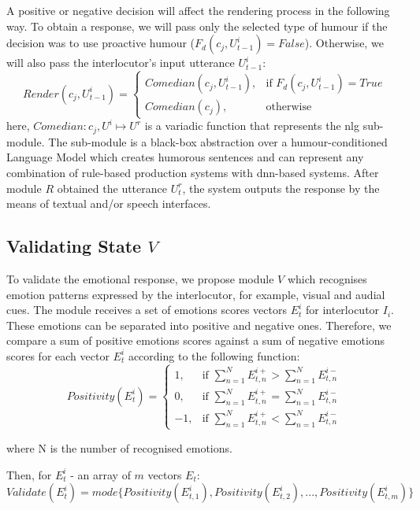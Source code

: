A positive or negative decision will affect the rendering process in the following way. To obtain a response, we will pass only the selected type of humour if the decision was to use proactive humour (\( F_d(c_j, U_{t-1}^i) = False\)). Otherwise, we will also pass the interlocutor's input utterance \( U_{t-1}^i\):
$$
Render(c_j, U_{t-1}^i)=
    \begin{cases}
        Comedian(c_j, U_{t-1}^i), & \text{if $F_d(c_j, U_{t-1}^i) = True$}\\
        Comedian(c_j), & \text{otherwise}
    \end{cases}
$$
here, \( Comedian: {c_j, U^i} \mapsto U^r\) is a variadic function that represents the \acrshort{nlg} sub-module. The sub-module is a black-box abstraction over a humour-conditioned Language Model which creates humorous sentences and can represent any combination of rule-based production systems with \acrshort{dnn}-based systems. After module \( R\) obtained the utterance \( U_t^r\), the system outputs the response by the means of textual and/or speech interfaces. \par

\subsection{Validating State \texorpdfstring{\( V\)}{V}}\label{subs:V}

To validate the emotional response, we propose module \( V\) which recognises emotion patterns expressed by the interlocutor, for example, visual and audial cues. The module receives a set of emotions scores vectors \( E_t^i\) for interlocutor \( I_i\). These emotions can be separated into positive and negative ones. Therefore, we compare a sum of positive emotions scores against a sum of negative emotions scores for each vector \( E_t^i\) according to the following function:
$$
Positivity(E_t^i)=
    \begin{cases}
        1, & \text{if $\sum_{n=1}^{N} E_{t,n}^{i+} > \sum_{n=1}^{N} E_{t,n}^{i-}$} \\
        0, & \text{if $\sum_{n=1}^{N} E_{t,n}^{i+} = \sum_{n=1}^{N} E_{t,n}^{i-}$} \\
        -1, & \text{if $\sum_{n=1}^{N} E_{t,n}^{i+} < \sum_{n=1}^{N} E_{t,n}^{i-}$}
    \end{cases}
$$ \par
where N is the number of recognised emotions. \par

Then, for \( E_t^{i}\) - an array of \( m\) vectors \( E_t\):
\[ Validate(E_t^{i})=mode\{Positivity(E_{t,1}^{i}), Positivity(E_{t,2}^{i}),..., Positivity(E_{t,m}^{i})\}\]

